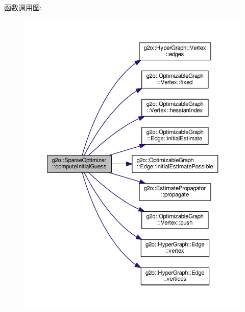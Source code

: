 函数调用图\-:
\nopagebreak
\begin{figure}[H]
\begin{center}
\leavevmode
\includegraphics[width=350pt]{classg2o_1_1SparseOptimizer_a2fba11c8572fce4a8c1bcca4fa3e43fb_cgraph}
\end{center}
\end{figure}


